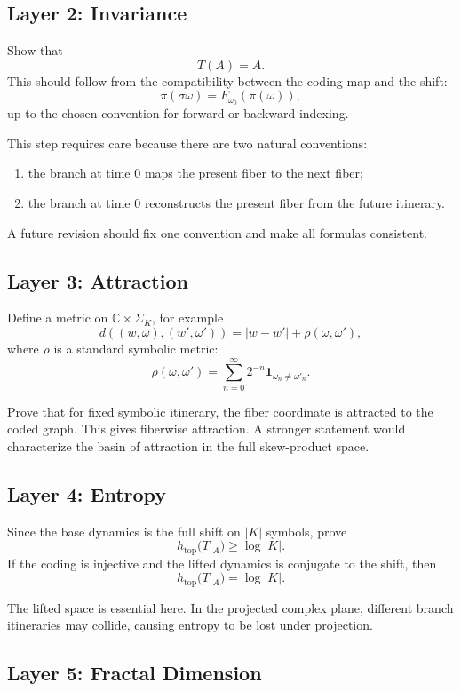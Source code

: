 \documentclass[12pt]{article}
\newcommand{\C}{\mathbb{C}}
\newcommand{\shift}{\sigma}
\newcommand{\HTop}{h_{\mathrm{top}}}
\begin{document}
	\subsection{Layer 2: Invariance}
	
	Show that
	\[
	T(A)=A.
	\]
	This should follow from the compatibility between the coding map and the shift:
	\[
	\pi(\shift\omega)=F_{\omega_0}(\pi(\omega)),
	\]
	up to the chosen convention for forward or backward indexing.
	
	This step requires care because there are two natural conventions:
	\begin{enumerate}
		\item the branch at time \(0\) maps the present fiber to the next fiber;
		\item the branch at time \(0\) reconstructs the present fiber from the future itinerary.
	\end{enumerate}
	A future revision should fix one convention and make all formulas consistent.
	
	\subsection{Layer 3: Attraction}
	
	Define a metric on \(\C\times\Sigma_K\), for example
	\[
	d((w,\omega),(w',\omega'))
	=
	|w-w'|+\rho(\omega,\omega'),
	\]
	where \(\rho\) is a standard symbolic metric:
	\[
	\rho(\omega,\omega')
	=
	\sum_{n=0}^{\infty} 2^{-n}
	\mathbf{1}_{\omega_n\neq\omega'_n}.
	\]
	
	Prove that for fixed symbolic itinerary, the fiber coordinate is attracted to the coded graph. This gives fiberwise attraction. A stronger statement would characterize the basin of attraction in the full skew-product space.
	
	\subsection{Layer 4: Entropy}
	
	Since the base dynamics is the full shift on \(|K|\) symbols, prove
	\[
	\HTop(T|_A)\geq \log |K|.
	\]
	If the coding is injective and the lifted dynamics is conjugate to the shift, then
	\[
	\HTop(T|_A)=\log |K|.
	\]
	
	The lifted space is essential here. In the projected complex plane, different branch itineraries may collide, causing entropy to be lost under projection.
	
	\subsection{Layer 5: Fractal Dimension}
	
\end{document}
